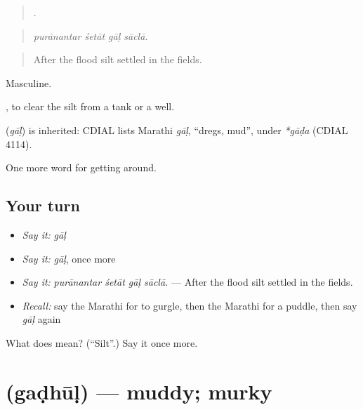 \begin{quote}
   .
\end{quote}

\begin{quote}
\emph{purānantar śetāt gāḷ sāclā.}
\end{quote}

\begin{quote}
After the flood silt settled in the fields.
\end{quote}

Masculine.

 , to clear the silt from a tank or a well.

\begin{cousinweb}
\textbf{} (\emph{gāḷ}) is inherited: CDIAL lists Marathi \emph{gāḷ}, \textquotedblleft{}dregs, mud\textquotedblright{}, under \emph{*gāḍa} (CDIAL 4114).
\end{cousinweb}

\begin{grammarlens}[title={What you've built}]
One more word for getting around.
\end{grammarlens}

\subsection*{Your turn}
\begin{itemize}
\raggedright
  \item \emph{Say it:} \emph{gāḷ}
  \item \emph{Say it:} \emph{gāḷ}, once more
  \item \emph{Say it:} \emph{purānantar śetāt gāḷ sāclā.} — After the flood silt settled in the fields.
  \item \emph{Recall:} say the Marathi for to gurgle, then the Marathi for a puddle, then say \emph{gāḷ} again
\end{itemize}

\begin{tcolorbox}[breakable,colback=teal!4,colframe=teal!35!black,title={Before you move on}]
What does  mean? (\textquotedblleft{}Silt\textquotedblright{}.) Say it once more.
\end{tcolorbox}
\section[\texorpdfstring{\mr{गढूळ} (gaḍhūḷ)}{गढूळ (gaḍhūḷ)}]{ (gaḍhūḷ) — muddy; murky}

